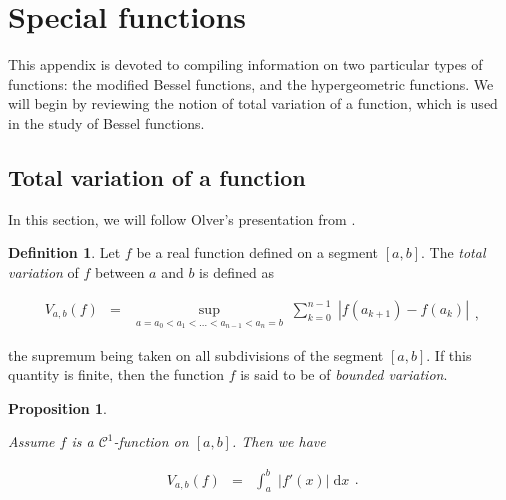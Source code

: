 \documentclass{jams-l}
\newtheorem{proposition}[theorem]{Proposition}
\theoremstyle{definition}
\newtheorem{definition}[theorem]{Definition}
\theoremstyle{remark}
\numberwithin{equation}{section}
\begin{document}
       

\section{Special functions}

    This appendix is devoted to compiling information on two particular types of functions: the modified Bessel functions, and the hypergeometric functions. We will begin by reviewing the notion of total variation of a function, which is used in the study of Bessel functions.
    
    \subsection{Total variation of a function}
    
        In this section, we will follow Olver's presentation from \cite[Sec. 1.11]{MR1429619}.
        
        \begin{definition}
        
            Let $f$ be a real function defined on a segment $\left[ a,b \right]$. The \textit{total variation} of $f$ between $a$ and $b$ is defined as
            
            \[ \begin{array}{ccc}
                    V_{a,b} \left( f \right) & = & \sup\limits_{a=a_0 < a_1 < \dots < a_{n-1} < a_n = b} \; \sum\limits_{k=0}^{n-1} \; \left \vert f \left( a_{k+1} \right) - f \left( a_k \right) \right \vert
                \end{array} , \]
            
            \noindent the supremum being taken on all subdivisions of the segment $\left[ a,b \right]$. If this quantity is finite, then the function $f$ is said to be of \textit{bounded variation}.
        
        \end{definition}
        
        \begin{proposition}
        \label{PropTotalVariationReal}
        
            Assume $f$ is a $\mathcal{C}^1$-function on $\left[ a,b \right]$. Then we have
            
            \[ \begin{array}{ccc}
                    V_{a,b} \left( f \right) & = & \int_a^b \; \left \vert f' \left( x \right) \right \vert \; \mathrm{d}x
                \end{array} . \]
        
        \end{proposition}
        
\end{document}
